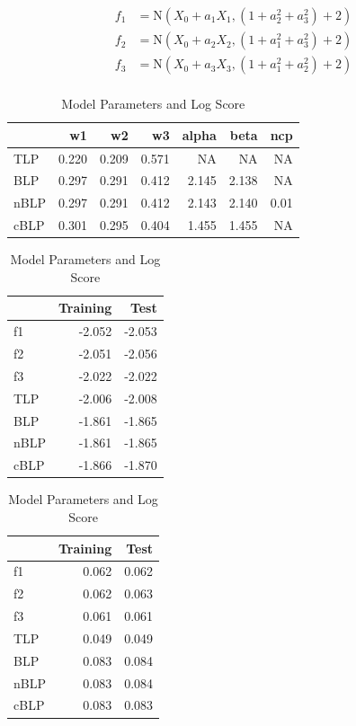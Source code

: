 \documentclass[]{article}
\begin{document}
\[
\begin{aligned}
f_1&=\text{N}(X_0+a_1X_1,(1+a^2_2+a^2_3)+2)\\
f_2&=\text{N}(X_0+a_2X_2,(1+a^2_1+a^2_3)+2)\\
f_3&=\text{N}(X_0+a_3X_3,(1+a^2_1+a^2_2)+2)\\
\end{aligned}
\]

\begin{table}[!h]
\caption{\label{tab:unnamed-chunk-11}Model Parameters and Log Score}

\centering
\begin{tabular}[t]{lrrrrrr}
\toprule
  & w1 & w2 & w3 & alpha & beta & ncp\\
\midrule
\rowcolor{gray!6}  TLP & 0.220 & 0.209 & 0.571 & NA & NA & NA\\
BLP & 0.297 & 0.291 & 0.412 & 2.145 & 2.138 & NA\\
\rowcolor{gray!6}  nBLP & 0.297 & 0.291 & 0.412 & 2.143 & 2.140 & 0.01\\
cBLP & 0.301 & 0.295 & 0.404 & 1.455 & 1.455 & NA\\
\bottomrule
\end{tabular}
\centering
\begin{tabular}[t]{lrr}
\toprule
\rowcolor{gray!6}    & Training & \vphantom{1} Test\\
\midrule
f1 & -2.052 & -2.053\\
\rowcolor{gray!6}  f2 & -2.051 & -2.056\\
f3 & -2.022 & -2.022\\
\rowcolor{gray!6}  TLP & -2.006 & -2.008\\
BLP & -1.861 & -1.865\\
\addlinespace
\rowcolor{gray!6}  nBLP & -1.861 & -1.865\\
cBLP & -1.866 & -1.870\\
\bottomrule
\end{tabular}
\centering
\begin{tabular}[t]{lrr}
\toprule
\rowcolor{gray!6}    & Training & Test\\
\midrule
f1 & 0.062 & 0.062\\
\rowcolor{gray!6}  f2 & 0.062 & 0.063\\
f3 & 0.061 & 0.061\\
\rowcolor{gray!6}  TLP & 0.049 & 0.049\\
BLP & 0.083 & 0.084\\
\addlinespace
\rowcolor{gray!6}  nBLP & 0.083 & 0.084\\
cBLP & 0.083 & 0.083\\
\bottomrule
\end{tabular}
\end{table}
\end{document}
